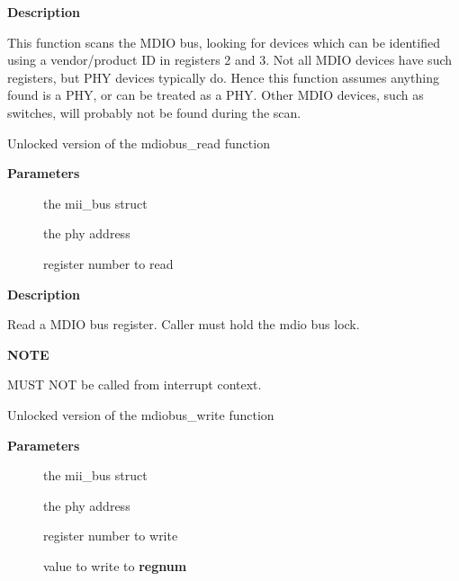 \documentclass[a4paper,8pt,english]{sphinxmanual}
\begin{document}
\textbf{Description}

This function scans the MDIO bus, looking for devices which can be
identified using a vendor/product ID in registers 2 and 3. Not all
MDIO devices have such registers, but PHY devices typically
do. Hence this function assumes anything found is a PHY, or can be
treated as a PHY. Other MDIO devices, such as switches, will
probably not be found during the scan.

\begin{fulllineitems}
\label{networking/kapi:c.__mdiobus_read}
Unlocked version of the mdiobus\_read function

\end{fulllineitems}


\textbf{Parameters}
\begin{description}
\item[{}] \leavevmode
the mii\_bus struct

\item[{}] \leavevmode
the phy address

\item[{}] \leavevmode
register number to read

\end{description}

\textbf{Description}

Read a MDIO bus register. Caller must hold the mdio bus lock.

\textbf{NOTE}

MUST NOT be called from interrupt context.

\begin{fulllineitems}
\label{networking/kapi:c.__mdiobus_write}
Unlocked version of the mdiobus\_write function

\end{fulllineitems}


\textbf{Parameters}
\begin{description}
\item[{}] \leavevmode
the mii\_bus struct

\item[{}] \leavevmode
the phy address

\item[{}] \leavevmode
register number to write

\item[{}] \leavevmode
value to write to \textbf{regnum}

\end{description}
\end{document}
